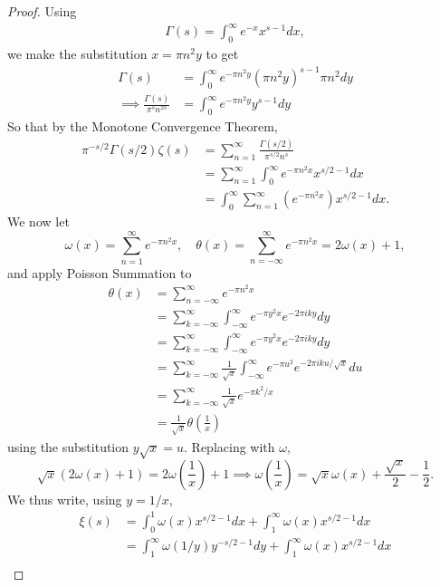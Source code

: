 \begin{proof}
	Using \begin{align*}
		\Gamma(s)=\int_{0}^{\infty} e^{-x}x^{s-1}dx,
	\end{align*}
	we make the substitution $x=\pi n^2y$ to get \begin{align*}
		\Gamma(s)&= \int_{0}^{\infty} e^{-\pi n^2 y} (\pi n^2 y)^{s-1} \pi n^2 dy\\
		\implies \frac{\Gamma(s)}{\pi^s n^{2s}} &= \int_{0}^{\infty} e^{-\pi n^2 y} y^{s-1} dy
	\end{align*}
	So that by the Monotone Convergence Theorem,\begin{align*}
		\pi^{-s/2}\Gamma(s/2)\zeta(s) &= \sum_{n=1}^{\infty}\frac{\Gamma(s/2)}{\pi^{s/2} n^s}\\
		&= \sum_{n=1}^{\infty} \int_{0}^{\infty} e^{-\pi n^2x} x^{s/2-1} dx\\
		&=  \int_{0}^{\infty}\sum_{n=1}^{\infty}\left(e^{-\pi n^2 x}\right)  x^{s/2-1} dx.
	\end{align*}
	We now let \[
		\omega(x) = \sum_{n=1}^{\infty} e^{-\pi n^2 x}, \quad \theta(x) = \sum_{n=-\infty}^{\infty} e^{-\pi n^2 x} = 2\omega(x)+1,
	\]
	and apply Poisson Summation to \begin{align*}
		\theta(x) &= \sum_{n=-\infty}^{\infty} e^{-\pi n^2 x}\\
		&= \sum_{k=-\infty}^{\infty} \int_{-\infty}^{\infty} e^{-\pi y^2 x} e^{-2\pi i k y} dy\\
		&= \sum_{k=-\infty}^{\infty} \int_{-\infty}^{\infty} e^{-\pi y^2 x} e^{-2\pi i k y} dy\\
		&= \sum_{k=-\infty}^{\infty} \frac{1}{\sqrt{x}} \int_{-\infty}^{\infty} e^{-\pi u^2} e^{-2\pi i k u /\sqrt{x}} du\\
		&= \sum_{k=-\infty}^{\infty} \frac{1}{\sqrt{x}} e^{-\pi k^2  / x}\\
		&= \frac{1}{\sqrt{x}} \theta \left(\frac{1}{x}\right)
	\end{align*}
	using the substitution $y\sqrt{x}=u$. Replacing with $\omega$, \[
	\sqrt{x}(2\omega(x)+1) = 2\omega\left(\frac{1}{x}\right)+1
	\implies \omega\left(\frac{1}{x}\right)=\sqrt{x}\omega(x) +\frac{\sqrt{x}}{2} - \frac{1}{2}.
	\]
	We thus write, using $y=1/x$, \begin{align*}
		\xi(s) &= \int_{0}^{1}\omega(x) x^{s/2-1} dx +
		\int_{1}^{\infty}\omega(x)  x^{s/2-1} dx\\
		&=\int_{1}^{\infty}\omega(1/y) y^{-s/2-1} dy +
		\int_{1}^{\infty}\omega(x)  x^{s/2-1} dx\\

\end{align*}
\end{proof}
